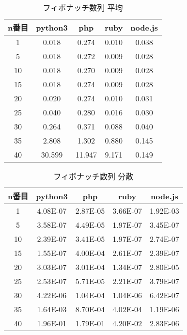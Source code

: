 \clearpage
\begin{table}[tb]
\centering
\begin{tabular}{|c||c|c|c|c|}
\hline

n番目	&python3	&php	&ruby	&node.js\\ \hline
1	&0.018	&0.274	&0.010	&0.038\\ \hline
5	&0.018	&0.272	&0.009	&0.028\\ \hline
10	&0.018	&0.270	&0.009	&0.028\\ \hline
15	&0.018	&0.274	&0.009	&0.028\\ \hline
20	&0.020	&0.274	&0.010	&0.031\\ \hline
25	&0.040	&0.280	&0.016	&0.030\\ \hline
30	&0.264	&0.371	&0.088	&0.040\\ \hline
35	&2.808	&1.302	&0.880	&0.145\\ \hline
40	&30.599	&11.947	&9.171	&0.149\\ \hline

\end{tabular}
\caption{フィボナッチ数列 平均}
\label{table:f-average}
\end{table}

\begin{table}[tb]
\centering
\begin{tabular}{|c||c|c|c|c|}
\hline

n番目	&python3	&php	&ruby	&node.js\\ \hline
1	&4.08E-07	&2.87E-05	&3.66E-07	&1.92E-03\\ \hline
5	&3.58E-07	&4.49E-05	&1.97E-07	&3.45E-07\\ \hline
10	&2.39E-07	&3.41E-05	&1.97E-07	&2.74E-07\\ \hline
15	&1.55E-07	&4.00E-04	&2.61E-07	&2.39E-07\\ \hline
20	&3.03E-07	&3.01E-04	&1.34E-07	&2.80E-05\\ \hline
25	&2.53E-07	&5.71E-05	&2.21E-07	&3.79E-07\\ \hline
30	&4.22E-06	&1.04E-04	&1.04E-06	&6.42E-07\\ \hline
35	&1.64E-03	&8.70E-04	&4.02E-04	&1.19E-06\\ \hline
40	&1.96E-01	&1.79E-01	&4.20E-02	&2.83E-06\\ \hline

\end{tabular}
\caption{フィボナッチ数列 分散}
\label{table:f-dispersion}
\end{table}

\clearpage

